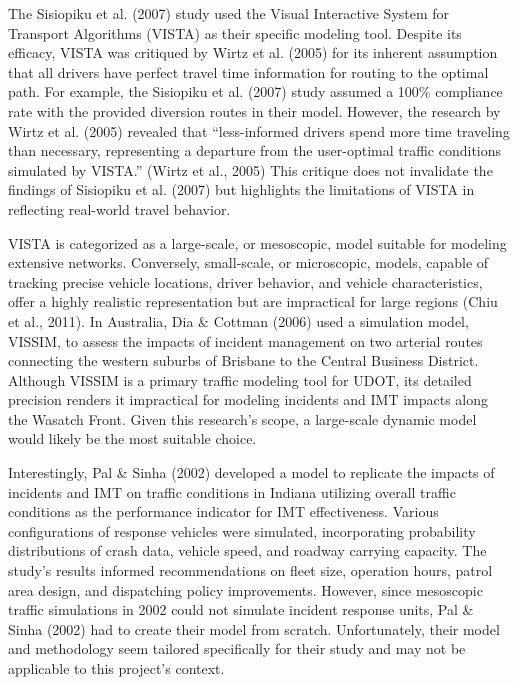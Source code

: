 \documentclass[fancy, oneside, mastersfancy, ms]{byuthesis}
\begin{document}
The Sisiopiku et al. (2007) study used the Visual Interactive System for
Transport Algorithms (VISTA) as their specific modeling tool. Despite
its efficacy, VISTA was critiqued by Wirtz et al. (2005) for its
inherent assumption that all drivers have perfect travel time
information for routing to the optimal path. For example, the Sisiopiku
et al. (2007) study assumed a 100\% compliance rate with the provided
diversion routes in their model. However, the research by Wirtz et al.
(2005) revealed that ``less-informed drivers spend more time traveling
than necessary, representing a departure from the user-optimal traffic
conditions simulated by VISTA.'' (Wirtz et al., 2005) This critique does
not invalidate the findings of Sisiopiku et al. (2007) but highlights
the limitations of VISTA in reflecting real-world travel behavior.

VISTA is categorized as a large-scale, or mesoscopic, model suitable for
modeling extensive networks. Conversely, small-scale, or microscopic,
models, capable of tracking precise vehicle locations, driver behavior,
and vehicle characteristics, offer a highly realistic representation but
are impractical for large regions (Chiu et al., 2011). In Australia, Dia
\& Cottman (2006) used a simulation model, VISSIM, to assess the impacts
of incident management on two arterial routes connecting the western
suburbs of Brisbane to the Central Business District. Although VISSIM is
a primary traffic modeling tool for UDOT, its detailed precision renders
it impractical for modeling incidents and IMT impacts along the Wasatch
Front. Given this research's scope, a large-scale dynamic model would
likely be the most suitable choice.

Interestingly, Pal \& Sinha (2002) developed a model to replicate the
impacts of incidents and IMT on traffic conditions in Indiana utilizing
overall traffic conditions as the performance indicator for IMT
effectiveness. Various configurations of response vehicles were
simulated, incorporating probability distributions of crash data,
vehicle speed, and roadway carrying capacity. The study's results
informed recommendations on fleet size, operation hours, patrol area
design, and dispatching policy improvements. However, since mesoscopic
traffic simulations in 2002 could not simulate incident response units,
Pal \& Sinha (2002) had to create their model from scratch.
Unfortunately, their model and methodology seem tailored specifically
for their study and may not be applicable to this project's context.
\end{document}
